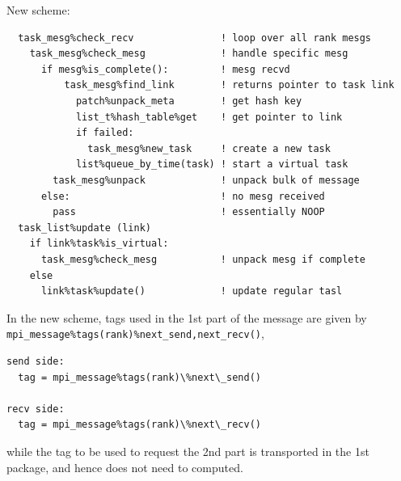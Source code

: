 \documentclass[paper=a4,fontsize=11pt]{scrartcl}
\numberwithin{equation}{section}		%
\numberwithin{figure}{section}			%
\numberwithin{table}{section}				%
\newcommand{\codecolor}{\color{Blue}}
\newcommand{\Code}[1]{{\codecolor\texttt{#1}}}
\begin{document}
New scheme:
{\codecolor\small\begin{verbatim}
  task_mesg%check_recv               ! loop over all rank mesgs
    task_mesg%check_mesg             ! handle specific mesg
      if mesg%is_complete():         ! mesg recvd
          task_mesg%find_link        ! returns pointer to task link
            patch%unpack_meta        ! get hash key
            list_t%hash_table%get    ! get pointer to link
            if failed:
              task_mesg%new_task     ! create a new task
            list%queue_by_time(task) ! start a virtual task
        task_mesg%unpack             ! unpack bulk of message
      else:                          ! no mesg received
        pass                         ! essentially NOOP
  task_list%update (link)
    if link%task%is_virtual:
      task_mesg%check_mesg           ! unpack mesg if complete
    else
      link%task%update()             ! update regular tasl
\end{verbatim}}
In the new scheme, tags used in the 1st part of the message are given by \Code{mpi\_message\%tags(rank)\%{next\_send,next\_recv}()},
{\codecolor\small\begin{verbatim}
send side:
  tag = mpi_message%tags(rank)\%next\_send()

recv side:
  tag = mpi_message%tags(rank)\%next\_recv()
\end{verbatim}}
while the tag to be used to request the 2nd part is transported in the 1st package, and hence does not need to computed.

\end{document}
